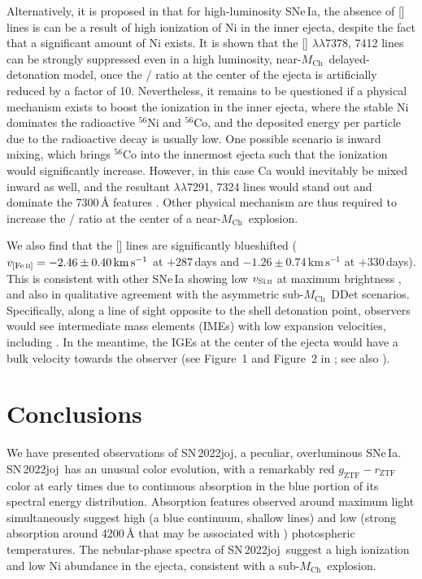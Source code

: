 \documentclass[twocolumn]{aastex631}
\newcommand{\sn}{SN\,2022joj}
\newcommand{\Mch}{$M_\mathrm{Ch}$}
\newcommand{\adam}[1]{\textcolor{orange}{[AAM: #1]}}
\newcommand{\chang}[1]{\textcolor{blue}{[Chang: #1]}}
\begin{document}
\begin{CJK*}{UTF8}{gbsn}
Alternatively, it is proposed in \citet{Blondin_2022} that for high-luminosity SNe\,Ia, the absence of [] lines is can be a result of high ionization of Ni in the inner ejecta, despite the fact that a significant amount of Ni exists. It is shown that the [] $\lambda\lambda$7378, 7412 lines can be strongly suppressed even in a high luminosity, near-\Mch\ delayed-detonation model, once the / ratio at the center of the ejecta is artificially reduced by a factor of 10. Nevertheless, it remains to be questioned if a physical mechanism exists to boost the ionization in the inner ejecta, where the stable Ni dominates the radioactive $^{56}$Ni and $^{56}$Co, and the deposited energy per particle due to the radioactive decay is usually low. One possible scenario is inward mixing, which brings $^{56}$Co into the innermost ejecta such that the ionization would significantly increase. However, in this case Ca would inevitably be mixed inward as well, and the resultant  $\lambda\lambda$7291, 7324 lines would stand out and dominate the 7300\,\r{A} features \citep{Blondin_2022}. Other physical mechanism are thus required to increase the / ratio at the center of a near-\Mch\ explosion.

We also find that the [] lines are significantly blueshifted ($v_\mathrm{[Fe\,\textsc{ii}]}=-2.46\pm0.40\mathrm{\,km\,s^{-1}}$ at $+287$\,days and $-1.26\pm0.74\mathrm{\,km\,s^{-1}}$ at $+330$\,days). This is consistent with other SNe\,Ia showing low $v_\mathrm{Si\,\textsc{ii}}$ at maximum brightness \citep{Maeda_2010,Maguire_2018,Li_2021}, and also in qualitative agreement with the asymmetric sub-\Mch\ DDet scenarios. Specifically, along a line of sight opposite to the shell detonation point, observers would see intermediate mass elements (IMEs) with low expansion velocities, including . In the meantime, the IGEs at the center of the ejecta would have a bulk velocity towards the observer (see Figure~1 and Figure~2 in \citealp{Bulla_2016}; see also \citealp{Fink_DD_2010}). %

\section{Conclusions} \label{sec:conclusion}
We have presented observations of \sn, a peculiar, overluminous SNe\,Ia. \sn\ has an unusual color evolution, with a remarkably red $g_\mathrm{ZTF}-r_\mathrm{ZTF}$ color at early times due to continuous absorption in the blue portion of its spectral energy distribution. Absorption features observed around maximum light simultaneously suggest high (a blue continuum, shallow  lines) and low (strong absorption around 4200\,\r{A} that may be associated with ) photospheric temperatures. The nebular-phase spectra of \sn\ suggest a high ionization and low Ni abundance in the ejecta, consistent with a sub-\Mch\ explosion.


\end{CJK*}
\end{document}
